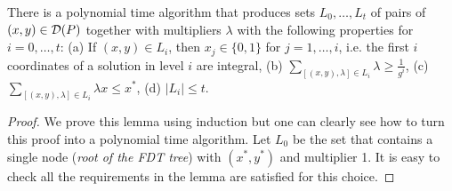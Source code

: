 \documentclass[runningheads]{llncs}
\begin{document}
\begin{lemma}\label{prune}
	There is a polynomial time algorithm that produces sets $L_0,\ldots,L_t$ of pairs of $(x,y)\in \operatorname{\mathcal{D}}(P)$ together with multipliers $\lambda$ with the following properties for $i=0,\ldots,t$:
		(a) If $(x,y)\in L_i$, then $x_j \in \{0,1\}$ for $j=1,\ldots,i$, i.e. the first $i$ coordinates of a solution in level $i$ are integral, (b) $\sum_{[(x,y),\lambda]\in L_i} \lambda\geq\frac{1}{g^i}$, (c) $\sum_{[(x,y),\lambda]\in L_i}\lambda x \leq x^*$, (d) $|L_i|\leq t$.
\end{lemma}
\begin{proof}
	We prove this lemma using induction but one can clearly see how to turn this proof into a polynomial time algorithm. Let $L_0$ be the set that contains a single node (\textit{root of the FDT tree}) with $(x^*,y^*)$ and multiplier 1. It is easy to check all the requirements in the lemma are satisfied for this choice.
	

\end{proof}
\end{document}
